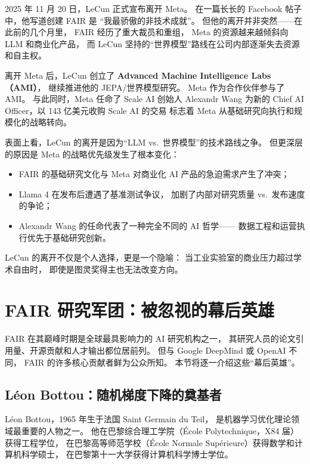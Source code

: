 2025 年 11 月 20 日，LeCun 正式宣布离开 Meta。
在一篇长长的 Facebook 帖子中，他写道创建 FAIR 是
``我最骄傲的非技术成就''。
但他的离开并非突然——在此前的几个月里，
FAIR 经历了重大裁员和重组，
Meta 的资源越来越倾斜向 LLM 和商业化产品，
而 LeCun 坚持的``世界模型''路线在公司内部逐渐失去资源和自主权。

离开 Meta 后，LeCun 创立了 \textbf{Advanced Machine Intelligence Labs（AMI）}，
继续推进他的 JEPA/世界模型研究。
Meta 作为合作伙伴参与了 AMI。
与此同时，Meta 任命了 Scale AI 创始人 Alexandr Wang
为新的 Chief AI Officer，以 143 亿美元收购 Scale AI 的交易
标志着 Meta 从基础研究向执行和规模化的战略转向。

\begin{whybox}
表面上看，LeCun 的离开是因为``LLM vs.\ 世界模型''的技术路线之争。
但更深层的原因是 Meta 的战略优先级发生了根本变化：
\begin{itemize}
  \item FAIR 的基础研究文化与 Meta 对商业化 AI 产品的急迫需求产生了冲突；
  \item Llama 4 在发布后遭遇了基准测试争议，
    加剧了内部对研究质量 vs.\ 发布速度的争论；
  \item Alexandr Wang 的任命代表了一种完全不同的 AI 哲学——
    数据工程和运营执行优先于基础研究创新。
\end{itemize}
LeCun 的离开不仅是个人选择，更是一个隐喻：
当工业实验室的商业压力超过学术自由时，
即使是图灵奖得主也无法改变方向。
\end{whybox}


\section{FAIR 研究军团：被忽视的幕后英雄}
\label{sec:fair-team}

FAIR 在其巅峰时期是全球最具影响力的 AI 研究机构之一，
其研究人员的论文引用量、开源贡献和人才输出都位居前列。
但与 Google DeepMind 或 OpenAI 不同，
FAIR 的许多核心贡献者鲜为公众所知。
本节将逐一介绍这些``幕后英雄''。

\subsection{L\'eon Bottou：随机梯度下降的奠基者}

L\'eon Bottou，1965 年生于法国 Saint Germain du Teil，
是机器学习优化理论领域最重要的人物之一。
他在巴黎综合理工学院（\'Ecole Polytechnique，X84 届）获得工程学位，
在巴黎高等师范学校（\'Ecole Normale Sup\'erieure）获得数学和计算机科学硕士，
在巴黎第十一大学获得计算机科学博士学位。


